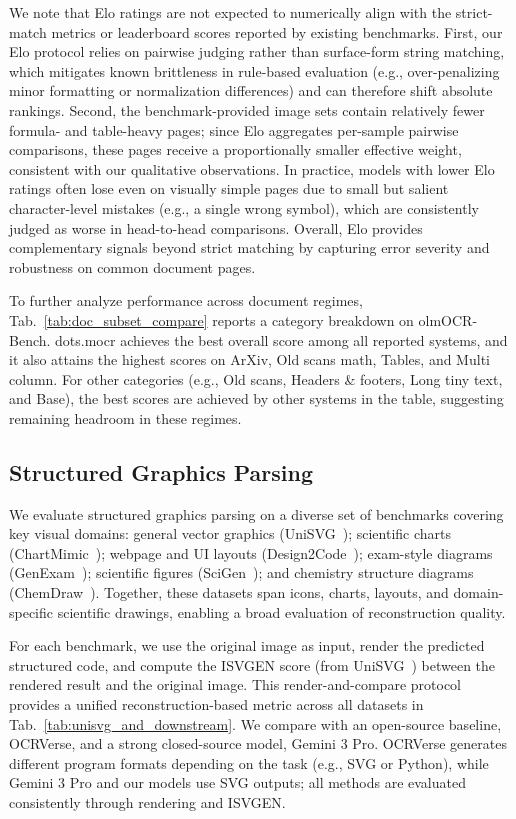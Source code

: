 \documentclass{article}
\begin{document}
We note that Elo ratings are not expected to numerically align with the strict-match metrics or leaderboard scores reported by existing benchmarks.
First, our Elo protocol relies on pairwise judging rather than surface-form string matching, which mitigates known brittleness in rule-based evaluation (e.g., over-penalizing minor formatting or normalization differences) and can therefore shift absolute rankings.
Second, the benchmark-provided image sets contain relatively fewer formula- and table-heavy pages; since Elo aggregates per-sample pairwise comparisons, these pages receive a proportionally smaller effective weight, consistent with our qualitative observations.
In practice, models with lower Elo ratings often lose even on visually simple pages due to small but salient character-level mistakes (e.g., a single wrong symbol), which are consistently judged as worse in head-to-head comparisons.
Overall, Elo provides complementary signals beyond strict matching by capturing error severity and robustness on common document pages.

To further analyze performance across document regimes, Tab.~\ref{tab:doc_subset_compare} reports a category breakdown on olmOCR-Bench.
dots.mocr achieves the best overall score among all reported systems, and it also attains the highest scores on ArXiv, Old scans math, Tables, and Multi column.
For other categories (e.g., Old scans, Headers \& footers, Long tiny text, and Base), the best scores are achieved by other systems in the table, suggesting remaining headroom in these regimes.


\subsection{Structured Graphics Parsing}
We evaluate structured graphics parsing on a diverse set of benchmarks covering key visual domains: general vector graphics (UniSVG~\cite{li2025unisvg}); scientific charts (ChartMimic~\cite{yang2024chartmimic}); webpage and UI layouts (Design2Code~\cite{si2025design2code}); exam-style diagrams (GenExam~\cite{wang2025genexam}); scientific figures (SciGen~\cite{lin2026scientific}); and chemistry structure diagrams (ChemDraw~\cite{zhao2025vincicoder}). Together, these datasets span icons, charts, layouts, and domain-specific scientific drawings, enabling a broad evaluation of reconstruction quality.

For each benchmark, we use the original image as input, render the predicted structured code, and compute the ISVGEN score (from UniSVG~\cite{li2025unisvg}) between the rendered result and the original image. This render-and-compare protocol provides a unified reconstruction-based metric across all datasets in Tab.~\ref{tab:unisvg_and_downstream}. We compare with an open-source baseline, OCRVerse, and a strong closed-source model, Gemini 3 Pro. OCRVerse generates different program formats depending on the task (e.g., SVG or Python), while Gemini 3 Pro and our models use SVG outputs; all methods are evaluated consistently through rendering and ISVGEN.
\end{document}
